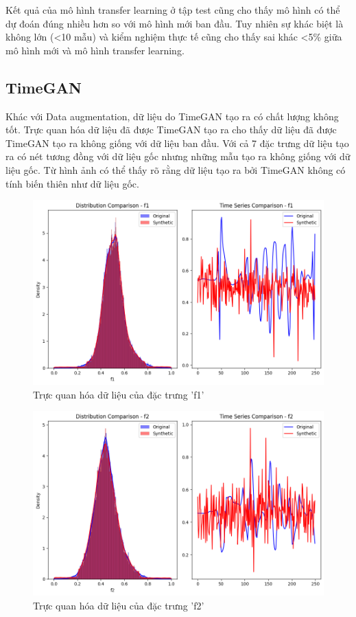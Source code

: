 Kết quả của mô hình transfer learning ở tập test cũng cho thấy mô hình có thể dự đoán đúng nhiều hơn so với mô hình mới ban đầu. Tuy nhiên sự khác biệt là không lớn (<10 mẫu) và kiểm nghiệm thực tế cũng cho thấy sai khác <5\% giữa mô hình mới và mô hình transfer learning.


\subsection{TimeGAN}

Khác với Data augmentation, dữ liệu do TimeGAN tạo ra có chất lượng không tốt. Trực quan hóa dữ liệu đã được TimeGAN tạo ra cho thấy dữ liệu đã được TimeGAN tạo ra không giống với dữ liệu ban đầu. Với cả 7 đặc trưng dữ liệu tạo ra có nét tương đồng với dữ liệu gốc nhưng những mẫu tạo ra không giống với dữ liệu gốc. Từ hình ảnh có thể thấy rõ rằng dữ liệu tạo ra bởi TimeGAN không có tính biến thiên như dữ liệu gốc.

\begin{figure}[H]
    \centering
    \includegraphics[width=1\textwidth]{Images/Improvement results/TimeGAN_f1.png}
    \caption{Trực quan hóa dữ liệu của đặc trưng 'f1'}
    \label{fig:timegan_data_f1}
\end{figure}

\begin{figure}[H]
    \centering
    \includegraphics[width=1\textwidth]{Images/Improvement results/TimeGAN_f2.png}
    \caption{Trực quan hóa dữ liệu của đặc trưng 'f2'}
    \label{fig:timegan_data_f2}
\end{figure}

